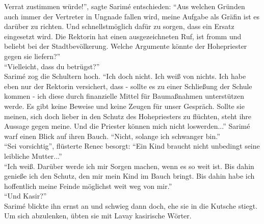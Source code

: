 Verrat zustimmen würde!'', sagte Sarimé entschieden: ``Aus welchen Gründen auch immer der Vertreter 
in Ungnade fallen wird, meine Aufgabe als Gräfin ist es darüber zu richten. Und schnellstmöglich 
dafür zu sorgen, dass ein Ersatz eingesetzt wird. Die Rektorin hat einen ausgezeichneten Ruf, ist 
fromm und beliebt bei der Stadtbevölkerung. Welche Argumente könnte der Hohepriester gegen sie 
liefern?''\\
``Vielleicht, dass du betrügst?''\\
Sarimé zog die Schultern hoch. ``Ich doch nicht. Ich weiß von nichts. Ich habe eben nur der 
Rektorin versichert, dass - sollte es zu einer Schließung der Schule kommen - ich diese durch 
finanzielle Mittel für Baumaßnahmen unterstützen werde. Es gibt keine Beweise und keine Zeugen für 
unser Gespräch. Sollte sie meinen, sich doch lieber in den Schutz des Hohepriesters zu flüchten, 
steht ihre Aussage gegen meine. Und die Priester können mich nicht loswerden...'' Sarimé warf einen 
Blick auf ihren Bauch. ``Nicht, solange ich schwanger bin.''\\
``Sei vorsichtig'', flüsterte Renec besorgt: ``Ein Kind braucht nicht unbedingt seine leibliche 
Mutter...''\\
``Ich weiß. Darüber werde ich mir Sorgen machen, wenn es so weit ist. Bis dahin genieße ich den 
Schutz, den mir mein Kind im Bauch bringt. Bis dahin habe ich hoffentlich meine Feinde möglichst 
weit weg von mir.''\\
``Und Kasir?''\\
Sarimé blickte ihn ernst an und schwieg dann doch, ehe sie in die Kutsche stiegt. Um sich 
abzulenken, übten sie mit Lavay kasirische Wörter.

